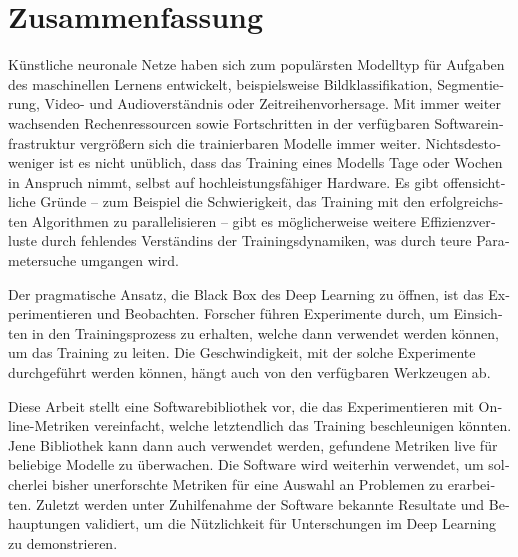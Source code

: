 \chapter*{Zusammenfassung}

\begin{otherlanguage}{german}
     Künstliche neuronale Netze haben sich zum populärsten Modelltyp für
     Aufgaben des maschinellen Lernens entwickelt, beispielsweise
     Bildklassifikation, Segmentierung, Video- und Audioverständnis oder
     Zeitreihenvorhersage. Mit immer weiter wachsenden Rechenressourcen sowie
     Fortschritten in der verfügbaren Softwareinfrastruktur vergrößern sich die
     trainierbaren Modelle immer weiter. Nichtsdestoweniger ist es nicht
     unüblich, dass das Training eines Modells Tage oder Wochen in Anspruch
     nimmt, selbst auf hochleistungsfähiger Hardware. Es gibt offensichtliche
     Gründe -- zum Beispiel die Schwierigkeit, das Training mit den
     erfolgreichsten Algorithmen zu parallelisieren -- gibt es möglicherweise
     weitere Effizienzverluste durch fehlendes Verständins der
     Trainingsdynamiken, was durch teure Parametersuche umgangen wird.

     Der pragmatische Ansatz, die Black Box des Deep Learning zu öffnen, ist das
     Experimentieren und Beobachten. Forscher führen Experimente durch, um
     Einsichten in den Trainingsprozess zu erhalten, welche dann verwendet
     werden können, um das Training zu leiten. Die Geschwindigkeit, mit der
     solche Experimente durchgeführt werden können, hängt auch von den verfügbaren
     Werkzeugen ab.

     Diese Arbeit stellt eine Softwarebibliothek vor, die das Experimentieren
     mit Online-Metriken vereinfacht, welche letztendlich das Training
     beschleunigen könnten. Jene Bibliothek kann dann auch verwendet werden,
     gefundene Metriken live für beliebige Modelle zu überwachen. Die Software
     wird weiterhin verwendet, um solcherlei bisher unerforschte Metriken für
     eine Auswahl an Problemen zu erarbeiten. Zuletzt werden unter Zuhilfenahme
     der Software bekannte Resultate und Behauptungen validiert, um die
     Nützlichkeit für Unterschungen im Deep Learning zu demonstrieren.

\end{otherlanguage}
